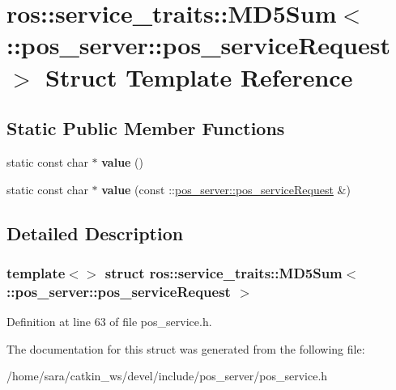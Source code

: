 \hypertarget{structros_1_1service__traits_1_1MD5Sum_3_01_1_1pos__server_1_1pos__serviceRequest_01_4}{}\section{ros\+:\+:service\+\_\+traits\+:\+:M\+D5\+Sum$<$ \+:\+:pos\+\_\+server\+:\+:pos\+\_\+service\+Request $>$ Struct Template Reference}
\label{structros_1_1service__traits_1_1MD5Sum_3_01_1_1pos__server_1_1pos__serviceRequest_01_4}
\subsection*{Static Public Member Functions}
\begin{DoxyCompactItemize}
\item 
\mbox{\label{structros_1_1service__traits_1_1MD5Sum_3_01_1_1pos__server_1_1pos__serviceRequest_01_4_ad00abc2105be0636e7b63ea24d6157f3}} 
static const char $\ast$ {\bfseries value} ()
\item 
\mbox{\label{structros_1_1service__traits_1_1MD5Sum_3_01_1_1pos__server_1_1pos__serviceRequest_01_4_a42f0f755ce4f877917d4d66ee86241b6}} 
static const char $\ast$ {\bfseries value} (const \+::\hyperlink{structpos__server_1_1pos__serviceRequest__}{pos\+\_\+server\+::pos\+\_\+service\+Request} \&)
\end{DoxyCompactItemize}


\subsection{Detailed Description}
\subsubsection*{template$<$$>$\newline
struct ros\+::service\+\_\+traits\+::\+M\+D5\+Sum$<$ \+::pos\+\_\+server\+::pos\+\_\+service\+Request $>$}



Definition at line 63 of file pos\+\_\+service.\+h.



The documentation for this struct was generated from the following file\+:\begin{DoxyCompactItemize}
\item 
/home/sara/catkin\+\_\+ws/devel/include/pos\+\_\+server/pos\+\_\+service.\+h\end{DoxyCompactItemize}
